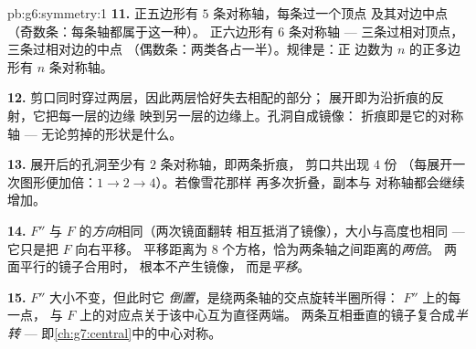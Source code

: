 \begin{solution}{pb:g6:symmetry:1}
\textbf{11.} 正五边形有 $5$ 条对称轴，每条过一个顶点
及其对边中点（奇数条：每条轴都属于这一种）。
正六边形有 $6$ 条对称轴 --- 三条过相对顶点，
三条过相对边的中点
（偶数条：两类各占一半）。规律是：正
边数为 $n$ 的正多边形有 $n$ 条对称轴。

\textbf{12.} 剪口同时穿过两层，因此两层恰好失去相配的部分；
展开即为沿折痕的反射，它把每一层的边缘
映到另一层的边缘上。孔洞自成镜像：
折痕即是它的对称轴 ---
无论剪掉的形状是什么。

\textbf{13.} 展开后的孔洞至少有 $2$ 条对称轴，即两条折痕，
剪口共出现 $4$ 份
（每展开一次图形便加倍：$1 \to 2 \to 4$）。若像雪花那样
再多次折叠，副本与
对称轴都会继续增加。

\textbf{14.} $F''$ 与 $F$ 的\emph{方向}相同（两次镜面翻转
相互抵消了镜像），大小与高度也相同 --- 它只是把 $F$ 向右平移。
平移距离为 $8$ 个方格，恰为两条轴之间距离的\emph{两倍}。
两面平行的镜子合用时，
根本不产生镜像，
而是\emph{平移}。

\textbf{15.} $F''$ 大小不变，但此时它
\emph{倒置}，是绕两条轴的交点旋转半圈所得：
$F''$ 上的每一点，
与 $F$ 上的对应点关于该中心互为直径两端。
两条互相垂直的镜子复合成\emph{半转} ---
即\cref{ch:g7:central}中的中心对称。
\end{solution}
